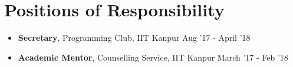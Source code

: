 \newcommand{\por}[3]{\textbf{#1}, #2 \hfill #3}

\section*{Positions of Responsibility}
\begin{itemize}

\setlength\itemsep{0pt}
\item \por{Secretary}{Programming Club, IIT Kanpur}{Aug '17 - April '18}
\item \por{Academic Mentor}{Counselling Service, IIT Kanpur}{March '17 - Feb '18}

\end{itemize}
